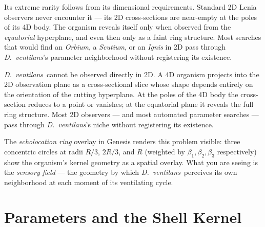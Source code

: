 \documentclass[11pt,a4paper]{article}
\newcommand{\spc}[1]{\textit{#1}}  %
\newcommand{\DV}{\spc{D.\ ventilans}}
\begin{document}
Its extreme rarity follows from its dimensional requirements. Standard 2D
Lenia observers never encounter it --- its 2D cross-sections are near-empty
at the poles of its 4D body. The organism reveals itself only when observed
from the \emph{equatorial} hyperplane, and even then only as a faint ring
structure. Most searches that would find an \spc{Orbium}, a \spc{Scutium}, or
an \spc{Ignis} in 2D pass through \DV's parameter neighborhood without
registering its existence.

\begin{callout}
\DV\ cannot be observed directly in 2D. A 4D organism projects into the 2D
observation plane as a cross-sectional slice whose shape depends entirely
on the orientation of the cutting hyperplane. At the poles of the 4D body
the cross-section reduces to a point or vanishes; at the equatorial plane
it reveals the full ring structure. Most 2D observers --- and most
automated parameter searches --- pass through \DV's niche without
registering its existence.

The \textit{echolocation ring} overlay in Genesis renders this problem
visible: three concentric circles at radii $R/3$, $2R/3$, and $R$
(weighted by $\beta_{1},\beta_{2},\beta_{3}$ respectively) show the
organism's kernel geometry as a spatial overlay. What you are seeing is
the \emph{sensory field} --- the geometry by which \DV\ perceives its own
neighborhood at each moment of its ventilating cycle.
\end{callout}

\section{Parameters and the Shell Kernel}
\end{document}
